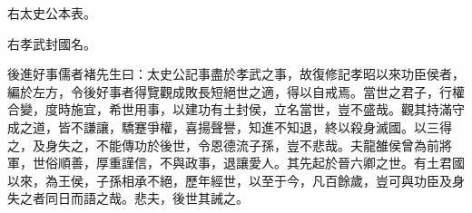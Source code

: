 右太史公本表。


右孝武封國名。

後進好事儒者褚先生曰：太史公記事盡於孝武之事，故復修記孝昭以來功臣侯者，編於左方，令後好事者得覽觀成敗長短絕世之適，得以自戒焉。當世之君子，行權合變，度時施宜，希世用事，以建功有土封侯，立名當世，豈不盛哉。觀其持滿守成之道，皆不謙讓，驕蹇爭權，喜揚聲譽，知進不知退，終以殺身滅國。以三得之，及身失之，不能傳功於後世，令恩德流子孫，豈不悲哉。夫龍雒侯曾為前將軍，世俗順善，厚重謹信，不與政事，退讓愛人。其先起於晉六卿之世。有土君國以來，為王侯，子孫相承不絕，歷年經世，以至于今，凡百餘歲，豈可與功臣及身失之者同日而語之哉。悲夫，後世其誡之。

